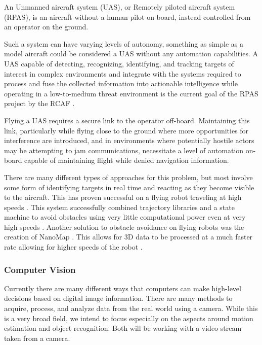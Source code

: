 \documentclass{article}
\begin{document}
		An Unmanned aircraft system (UAS), or Remotely piloted aircraft system (RPAS), is an aircraft without a human pilot on-board, instead controlled from an operator on the ground. 
		
		Such a system can have varying levels of autonomy, something as simple as a model aircraft could be considered a UAS without any automation capabilities. A UAS capable of detecting, recognizing, identifying, and tracking targets of interest in complex environments and integrate with the systems required to process and fuse the collected information into actionable intelligence while operating in a low-to-medium threat environment is the current goal of the RPAS project by the RCAF \cite{RPAS}. 
		
		Flying a UAS requires a secure link to the operator off-board. Maintaining this link, particularly while flying close to the ground where more opportunities for interference are introduced, and in environments where potentially hostile actors may be attempting to jam communications, necessitate a level of automation on-board capable of maintaining flight while denied navigation information.
		
		There are many different types of approaches for this problem, but most involve some form of identifying targets in real time and reacting as they become visible to the aircraft. This has proven successful on a flying robot traveling at high speeds \cite{barry2015pushbroom}. This system successfully combined trajectory libraries and a state machine to avoid obstacles using very little computational power even at very high speeds \cite{barry2018high}. Another solution to obstacle avoidance on flying robots was the creation of NanoMap \cite{2018nanomap}. This allows for 3D data to be processed at a much faster rate allowing for higher speeds of the robot \cite{2018nanomap}.
		
		\subsubsection{Computer Vision}
		
		Currently there are many different ways that computers can make high-level decisions based on digital image information. There are many methods to acquire, process, and analyze data from the real world using a camera. While this is a very broad field, we intend to focus especially on the aspects around motion estimation and object recognition. Both will be working with a video stream taken from a camera. 
		
\end{document}
